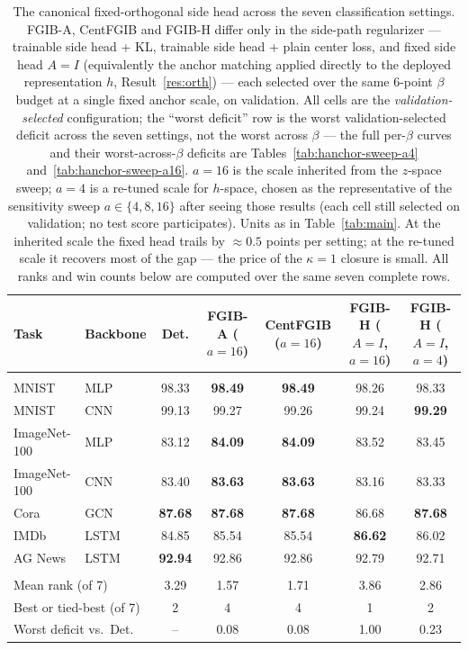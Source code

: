 \begin{table}[t]
\caption{The canonical fixed-orthogonal side head across the seven classification settings. FGIB-A, CentFGIB and FGIB-H differ only in the side-path regularizer --- trainable side head + KL, trainable side head + plain center loss, and fixed side head $A{=}I$ (equivalently the anchor matching applied directly to the deployed representation $h$, Result~\ref{res:orth}) --- each selected over the same 6-point $\beta$ budget at a single fixed anchor scale, on validation. All cells are the \emph{validation-selected} configuration; the ``worst deficit'' row is the worst validation-selected deficit across the seven settings, not the worst across $\beta$ --- the full per-$\beta$ curves and their worst-across-$\beta$ deficits are Tables~\ref{tab:hanchor-sweep-a4} and~\ref{tab:hanchor-sweep-a16}. $a{=}16$ is the scale inherited from the $z$-space sweep; $a{=}4$ is a re-tuned scale for $h$-space, chosen as the representative of the sensitivity sweep $a\in\{4,8,16\}$ after seeing those results (each cell still selected on validation; no test score participates). Units as in Table~\ref{tab:main}. At the inherited scale the fixed head trails by $\approx 0.5$ points per setting; at the re-tuned scale it recovers most of the gap --- the price of the $\kappa{=}1$ closure is small. All ranks and win counts below are computed over the same seven complete rows.}
\label{tab:hanchor}
\begin{center}\small
\begin{tabular}{llccccc}
Task & Backbone & Det. & FGIB-A ($a{=}16$) & CentFGIB ($a{=}16$) & FGIB-H ($A{=}I$, $a{=}16$) & FGIB-H ($A{=}I$, $a{=}4$) \\ \hline \\[-1.8ex]
MNIST & MLP & 98.33 & \textbf{98.49} & \textbf{98.49} & 98.26 & 98.33 \\
MNIST & CNN & 99.13 & 99.27 & 99.26 & 99.24 & \textbf{99.29} \\
ImageNet-100 & MLP & 83.12 & \textbf{84.09} & \textbf{84.09} & 83.52 & 83.45 \\
ImageNet-100 & CNN & 83.40 & \textbf{83.63} & \textbf{83.63} & 83.16 & 83.33 \\
Cora & GCN & \textbf{87.68} & \textbf{87.68} & \textbf{87.68} & 86.68 & \textbf{87.68} \\
IMDb & LSTM & 84.85 & 85.54 & 85.54 & \textbf{86.62} & 86.02 \\
AG News & LSTM & \textbf{92.94} & 92.86 & 92.86 & 92.79 & 92.71 \\
\hline \\[-1.8ex]
\multicolumn{2}{l}{Mean rank (of 7)} & 3.29 & 1.57 & 1.71 & 3.86 & 2.86 \\
\multicolumn{2}{l}{Best or tied-best (of 7)} & 2 & 4 & 4 & 1 & 2 \\
\multicolumn{2}{l}{Worst deficit vs.\ Det.} & -- & 0.08 & 0.08 & 1.00 & 0.23 \\
\end{tabular}\end{center}\end{table}

